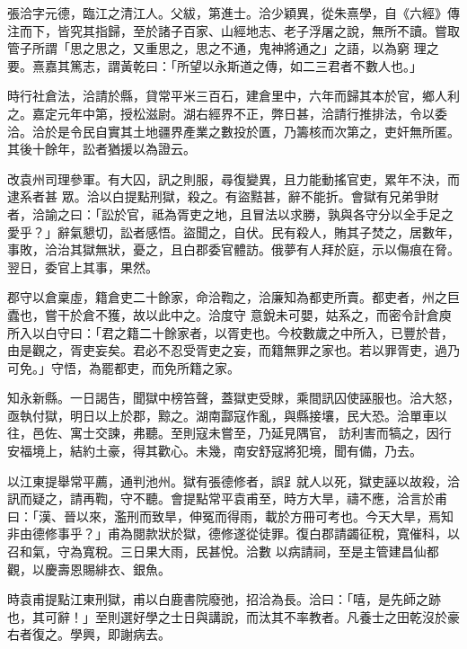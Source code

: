 \begin{pinyinscope}
 張洽字元德，臨江之清江人。父紱，第進士。洽少穎異，從朱熹學，自《六經》傳注而下，皆究其指歸，至於諸子百家、山經地志、老子浮屠之說，無所不讀。嘗取管子所謂「思之思之，又重思之，思之不通，鬼神將通之」之語，以為窮
 理之要。熹嘉其篤志，謂黃乾曰：「所望以永斯道之傳，如二三君者不數人也。」



 時行社倉法，洽請於縣，貸常平米三百石，建倉里中，六年而歸其本於官，鄉人利之。嘉定元年中第，授松滋尉。湖右經界不正，弊日甚，洽請行推排法，令以委洽。洽於是令民自實其土地疆界產業之數投於匱，乃籌核而次第之，吏奸無所匿。其後十餘年，訟者猶援以為證云。



 改袁州司理參軍。有大囚，訊之則服，尋復變異，且力能動搖官吏，累年不決，而逮系者甚
 眾。洽以白提點刑獄，殺之。有盜黠甚，辭不能折。會獄有兄弟爭財者，洽諭之曰：「訟於官，祗為胥吏之地，且冒法以求勝，孰與各守分以全手足之愛乎？」辭氣懇切，訟者感悟。盜聞之，自伏。民有殺人，賄其子焚之，居數年，事敗，洽治其獄無狀，憂之，且白郡委官體訪。俄夢有人拜於庭，示以傷痕在脅。翌日，委官上其事，果然。



 郡守以倉稟虛，籍倉吏二十餘家，命洽鞫之，洽廉知為都吏所賣。都吏者，州之巨蠹也，嘗干於倉不獲，故以此中之。洽度守
 意銳未可嬰，姑系之，而密令計倉庾所入以白守曰：「君之籍二十餘家者，以胥吏也。今校數歲之中所入，已豐於昔，由是觀之，胥吏妄矣。君必不忍受胥吏之妄，而籍無罪之家也。若以罪胥吏，過乃可免。」守悟，為罷都吏，而免所籍之家。



 知永新縣。一日謁告，聞獄中榜笞聲，蓋獄吏受賕，乘間訊囚使誣服也。洽大怒，亟執付獄，明日以上於郡，黥之。湖南酃寇作亂，與縣接壤，民大恐。洽單車以往，邑佐、寓士交諫，弗聽。至則寇未嘗至，乃延見隅官，
 訪利害而犒之，因行安福境上，結約土豪，得其歡心。未幾，南安舒寇將犯境，聞有備，乃去。



 以江東提舉常平薦，通判池州。獄有張德修者，誤𧾷就人以死，獄吏誣以故殺，洽訊而疑之，請再鞫，守不聽。會提點常平袁甫至，時方大旱，禱不應，洽言於甫曰：「漢、晉以來，濫刑而致旱，伸冤而得雨，載於方冊可考也。今天大旱，焉知非由德修事乎？」甫為閱款狀於獄，德修遂從徒罪。復白郡請蠲征稅，寬催科，以召和氣，守為寬稅。三日果大雨，民甚悅。洽數
 以病請祠，至是主管建昌仙都觀，以慶壽恩賜緋衣、銀魚。



 時袁甫提點江東刑獄，甫以白鹿書院廢弛，招洽為長。洽曰：「嘻，是先師之跡也，其可辭！」至則選好學之士日與講說，而汰其不率教者。凡養士之田乾沒於豪右者復之。學興，即謝病去。




\end{pinyinscope}
